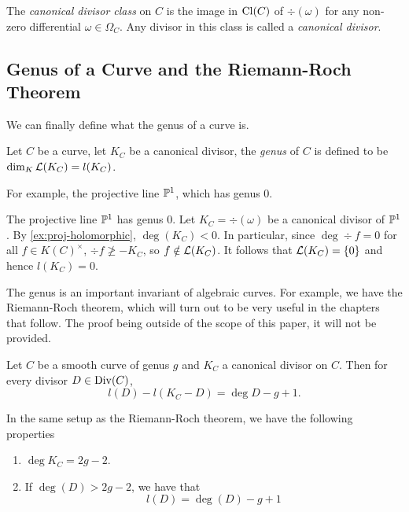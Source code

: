 \begin{definition}
	The \emph{canonical divisor class} on $C$ is the image in $\operatorname{Cl}(C)$ of
	$\div(\omega)$ for any non-zero differential $\omega \in \Omega_C$.
	Any divisor in this class is called a \emph{canonical divisor}.
\end{definition}

\subsection{Genus of a Curve and the Riemann-Roch Theorem}

We can finally define what the genus of a curve is.
\begin{definition}
	Let $C$ be a curve, let $K_C$ be a canonical divisor,
	the \emph{genus} of $C$ is defined to be $\dim_K \mathcal{L}(K_C) = l(K_C)$.
\end{definition}

For example, the projective line $\mathbb{P}^1$, which has genus 0.
\begin{example}
	\label{ex:proj-genus}
	The projective line $\mathbb{P}^1$ has genus 0.
	Let $K_C = \div(\omega)$ be a canonical divisor of $\mathbb{P}^1$.
	By \ref{ex:proj-holomorphic}, $\deg(K_C) < 0$. In particular, 
	since $\deg \div f = 0$ for all $f \in K(C)^\times$,
	$\div f \not\geq -K_C$,
	so $f \notin \mathcal{L}(K_C)$. It follows that $\mathcal{L}(K_C) = \{0\}$ and
	hence $l(K_C) = 0$.
\end{example}

The genus is an important invariant  of algebraic curves.
For example, we have the Riemann-Roch theorem, which will
turn out to be very useful in the chapters that follow.
The proof being outside of the scope of this paper, it will not be provided.
\begin{theorem}
	\label{thm:riemann-roch}
	Let $C$ be a smooth curve of genus $g$ and $K_C$ a canonical divisor on $C$.
	Then for every divisor $D \in \operatorname{Div}(C)$,
	\begin{equation*}
		l(D) - l(K_C - D) = \deg D - g + 1.
	\end{equation*}
\end{theorem}

\begin{corollary}
	\label{cor:riemann-roch}
	In the same setup as the Riemann-Roch theorem, we have the following properties
	\begin{enumerate}[itemsep=0em, label=(\alph*)]
		\item $\deg K_C = 2g - 2$.
		\item If $\deg(D) > 2g - 2$, we have that
			\begin{equation*}
				l(D) = \deg(D) - g + 1
			\end{equation*}	
	\end{enumerate}
\end{corollary}

